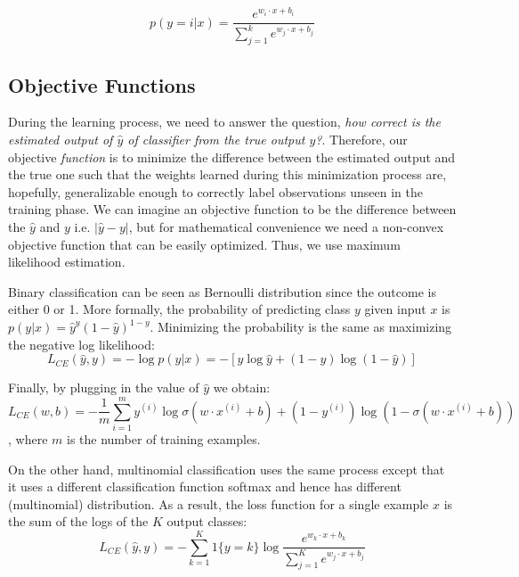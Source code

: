 $$p ( y = i | x ) = \frac { e ^ { w _ { i } \cdot x + b _ { i } } } { \sum _ { j = 1 } ^ { k } e ^ { w _ { j } \cdot x + b _ { j } } }$$



\subsection{Objective Functions}

During the learning process, we need to answer the question, \emph{how correct is the estimated output of $\hat{y}$ of classifier from the true output $y$?}. Therefore, our objective \emph{function} is to minimize the difference between the estimated output and the true one such that the weights learned during this minimization process are, hopefully,  generalizable enough to correctly label observations unseen in the training phase. We can imagine an objective function to be the difference between the $\hat{y}$ and $y$ i.e. $\left | \hat{y} - y \right |$, but for mathematical convenience we need a non-convex objective function that can be easily optimized. Thus, we use maximum likelihood estimation. 

Binary classification can be seen as Bernoulli distribution since the outcome is either 0 or 1. More formally, the probability of predicting class $y$ given input $x$ is  $p ( y | x ) = \hat { y } ^ { y } ( 1 - \hat { y } ) ^ { 1 - y }$. Minimizing the probability is the same as maximizing the negative log likelihood:
 $$L _ { C E } ( \hat { y } , y ) = - \log p ( y | x ) = - [ y \log \hat { y } + ( 1 - y ) \log ( 1 - \hat { y } ) ]$$

Finally, by plugging in the value of $\hat{y}$ we obtain:
$$ L _ { C E } ( w , b ) = - \frac { 1 } { m } \sum _ { i = 1 } ^ { m } y ^ { ( i ) } \log \sigma \left( w \cdot x ^ { ( i ) } + b \right) + \left( 1 - y ^ { ( i ) } \right) \log \left( 1 - \sigma \left( w \cdot x ^ { ( i ) } + b \right) \right) $$, where $m$ is the number of training examples.

On the other hand, multinomial classification uses the same process except that it uses a different classification function softmax and hence has different (multinomial) distribution. As a result, the loss function for a single example $x$ is the sum of the logs of the $K$ output classes:
$$ L _ { C E } ( \hat { y } , y ) = - \sum _ { k = 1 } ^ { K } 1 \{ y = k \} \log \frac { e ^ { w _ { k } \cdot x + b _ { k } } } { \sum _ { j = 1 } ^ { K } e ^ { w _ { j } \cdot x + b _ { j } } } $$


